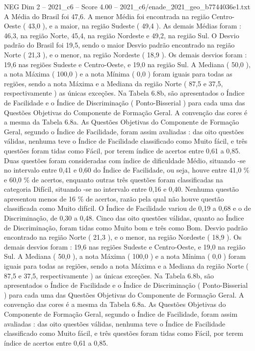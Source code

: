 \begin{textsample}{NEG Dim 2 – 2021\_c6 – Score 4.00 – 2021\_c6/enade\_2021\_geo\_b7744036e1.txt}
A Média do Brasil foi 47,6.
A menor Média foi encontrada na região Centro-Oeste ( 43,0 ), e a maior, na região Sudeste ( 49,4 ).
As demais Médias foram : 46,3, na região Norte, 45,4, na região Nordeste e 49,2, na região Sul.
O Desvio padrão do Brasil foi 19,5, sendo o maior Desvio padrão encontrado na região Norte ( 21,3 ), e o menor, na região Nordeste ( 18,9 ).
Os demais desvios foram : 19,6 nas regiões Sudeste e Centro-Oeste, e 19,0 na região Sul.
A Mediana ( 50,0 ), a nota Máxima ( 100,0 ) e a nota Mínima ( 0,0 ) foram iguais para todas as regiões, sendo a nota Máxima e a Mediana da região Norte ( 87,5 e 37,5, respectivamente ) as únicas exceções.
Na Tabela 6.8b, são apresentados o Índice de Facilidade e o Índice de Discriminação ( Ponto-Bisserial ) para cada uma das Questões Objetivas do Componente de Formação Geral.
A convenção das cores é a mesma da Tabela 6.8a.
As Questões Objetivas do Componente de Formação Geral, segundo o Índice de Facilidade, foram assim avaliadas : das oito questões válidas, nenhuma teve o Índice de Facilidade classificado como Muito fácil, e três questões foram tidas como Fácil, por terem índice de acertos entre 0,61 a 0,85.
Duas questões foram consideradas com índice de dificuldade Médio, situando -se no intervalo entre 0,41 e 0,60 do Índice de Facilidade, ou seja, houve entre 41,0 \% e 60,0 \% de acertos, enquanto outras três questões foram classificadas na categoria Difícil, situando -se no intervalo entre 0,16 e 0,40.
Nenhuma questão apresentou menos de 16 \% de acertos, razão pela qual não houve questão classificada como Muito difícil.
O Índice de Facilidade variou de 0,19 a 0,68 e o de Discriminação, de 0,30 a 0,48.
Cinco das oito questões válidas, quanto ao Índice de Discriminação, foram tidas como Muito bom e três como Bom.
Desvio padrão encontrado na região Norte ( 21,3 ), e o menor, na região Nordeste ( 18,9 ).
Os demais desvios foram : 19,6 nas regiões Sudeste e Centro-Oeste, e 19,0 na região Sul.
A Mediana ( 50,0 ), a nota Máxima ( 100,0 ) e a nota Mínima ( 0,0 ) foram iguais para todas as regiões, sendo a nota Máxima e a Mediana da região Norte ( 87,5 e 37,5, respectivamente ) as únicas exceções.
Na Tabela 6.8b, são apresentados o Índice de Facilidade e o Índice de Discriminação ( Ponto-Bisserial ) para cada uma das Questões Objetivas do Componente de Formação Geral.
A convenção das cores é a mesma da Tabela 6.8a.
As Questões Objetivas do Componente de Formação Geral, segundo o Índice de Facilidade, foram assim avaliadas : das oito questões válidas, nenhuma teve o Índice de Facilidade classificado como Muito fácil, e três questões foram tidas como Fácil, por terem índice de acertos entre 0,61 a 0,85.

\end{textsample}
